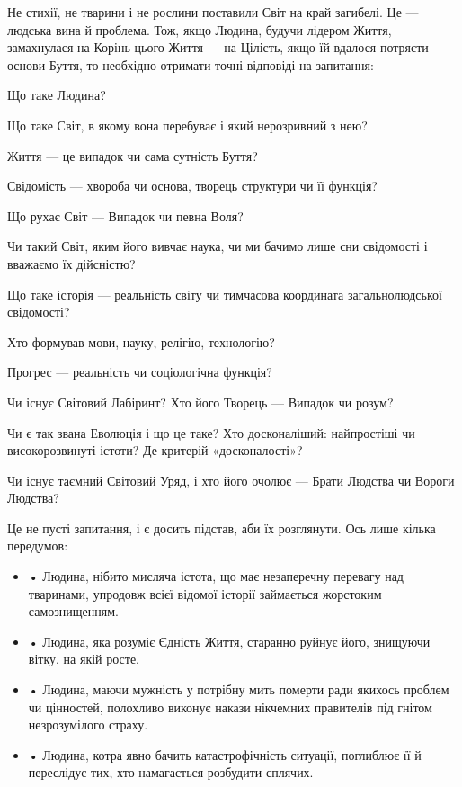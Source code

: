 Не стихії, не тварини і не рослини поставили Світ на край загибелі. Це —
людська вина й проблема. Тож, якщо Людина, будучи лідером Життя, замахнулася на
Корінь цього Життя — на Цілість, якщо їй вдалося потрясти основи Буття, то
необхідно отримати точні відповіді на запитання:

Що таке Людина?

Що таке Світ, в якому вона перебуває і який нерозривний з нею?

Життя — це випадок чи сама сутність Буття?

Свідомість — хвороба чи основа, творець структури чи її функція?

Що рухає Світ — Випадок чи певна Воля?

Чи такий Світ, яким його вивчає наука, чи ми бачимо лише сни свідомості і
вважаємо їх дійсністю?

Що таке історія — реальність світу чи тимчасова координата загальнолюдської
свідомості?

Хто формував мови, науку, релігію, технологію?

Прогрес — реальність чи соціологічна функція?

Чи існує Світовий Лабіринт? Хто його Творець — Випадок чи розум?

Чи є так звана Еволюція і що це таке? Хто досконаліший: найпростіші чи
високорозвинуті істоти? Де критерій «досконалості»?

Чи існує таємний Світовий Уряд, і хто його очолює — Брати Людства чи Вороги
Людства?

Це не пусті запитання, і є досить підстав, аби їх розглянути. Ось лише кілька
передумов:

\begin{itemize}
	

\item • Людина, нібито мисляча істота, що має незаперечну перевагу над тваринами,
упродовж всієї відомої історії займається жорстоким самознищенням.

\item • Людина, яка розуміє Єдність Життя, старанно руйнує його, знищуючи вітку, на
якій росте.

\item • Людина, маючи мужність у потрібну мить померти ради якихось проблем чи
				цінностей, полохливо виконує накази нікчемних правителів під гнітом
								незрозумілого страху.

\item • Людина, котра явно бачить катастрофічність ситуації, поглиблює її й
				переслідує тих, хто намагається розбудити сплячих.

\end{itemize}

